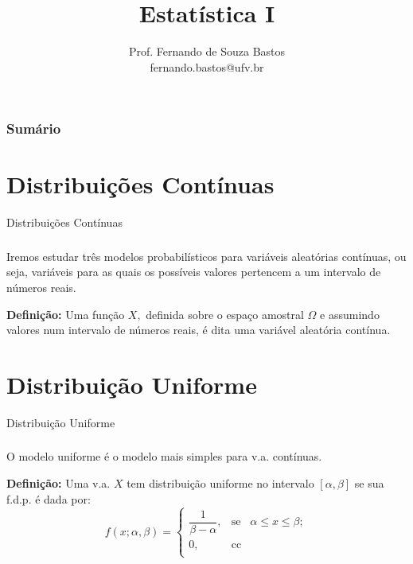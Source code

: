 \documentclass[14pt,aspectratio=1610]{beamer}
\title{Estatística I}
\author{Prof. Fernando de Souza Bastos \texorpdfstring{\\ fernando.bastos@ufv.br}{}}
\institute{Departamento de Estatística \texorpdfstring{\\ Universidade Federal de Viçosa}{}\texorpdfstring{\\ Campus UFV - Viçosa}{}}
\date{}
\begin{document}
%


\frame{\titlepage}

\begin{frame}{}
\frametitle{\bf Sumário}
\tableofcontents
\end{frame}

\section{Distribuições Contínuas}
\begin{frame}{Distribuições Contínuas}
\frametitle{}
\begin{block}{}
\justifying
Iremos estudar três modelos probabilísticos para variáveis aleatórias contínuas,
ou seja, variáveis para as quais os possíveis valores pertencem a um intervalo
de números reais.
\end{block}
\pause
\begin{block}{}
\justifying
{\bf Definição:} Uma função $X,$ definida sobre o espaço amostral $\Omega$ e assumindo valores num intervalo de números reais, é dita uma variável aleatória contínua.
\end{block}
\end{frame}

\section{Distribuição Uniforme}
\begin{frame}{Distribuição Uniforme}
\frametitle{}
\begin{block}{}
\justifying
O modelo uniforme é o modelo mais simples para v.a. contínuas.
\end{block}
\pause
\begin{block}{}
\justifying
{\bf Definição:} Uma v.a. $X$ tem distribuição uniforme no intervalo $[\alpha,\beta]$ se sua f.d.p. é dada por:
$$
f(x;\alpha,\beta)=\left\{
\begin{array}{ccccc}
\dfrac{1}{\beta-\alpha}, & \textrm{se} & \alpha\leq x \leq \beta     ;\\
                      0, & \textrm{cc}        & \\
\end{array}
\right.
$$
\end{block}
\end{frame}
\end{document}
